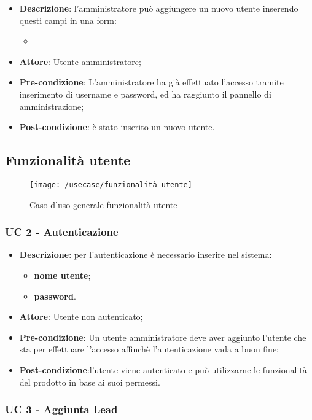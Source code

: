\begin{itemize}
	\item \textbf{Descrizione}: l'amministratore può aggiungere un nuovo utente inserendo questi campi in una form:
	\begin{itemize}
		\item %
	\end{itemize}
	\item \textbf{Attore}: Utente amministratore;
	\item \textbf{Pre-condizione}: L'amministratore ha già effettuato l'accesso tramite inserimento di username e password, ed ha raggiunto il pannello di amministrazione;
	\item \textbf{Post-condizione}: è stato inserito un nuovo utente.
\end{itemize}

\subsection{Funzionalità utente}
\begin{figure}[h]
	\centering
	\texttt{[image: /usecase/funzionalità-utente]}
	\caption{Caso d'uso generale-funzionalità utente}
\end{figure}
\subsubsection{UC 2 - Autenticazione}

\begin{itemize}
	\item \textbf{Descrizione}: per l'autenticazione è necessario inserire nel sistema:
	\begin{itemize}
		\item \textbf{nome utente};
		\item \textbf{password}.
	\end{itemize}
	\item \textbf{Attore}: Utente non autenticato;
	\item \textbf{Pre-condizione}: Un utente amministratore deve aver aggiunto l'utente che sta per effettuare l'accesso affinchè l'autenticazione vada a buon fine;
	\item \textbf{Post-condizione}:l'utente viene autenticato e può utilizzarne le funzionalità del prodotto in base ai suoi permessi.
\end{itemize}

\subsubsection{UC 3 - Aggiunta Lead}

